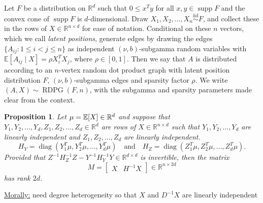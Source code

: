 \documentclass[aspectratio=169]{beamer}
\newcommand{\RDPG}{\operatorname{RDPG}}
\newcommand{\R}{\mathbb{R}}
\newcommand{\E}[2][]{%
	\ifthenelse{ \equal{#1}{} }
	{\ensuremath{\mathbb{E} \brac*{#2}}}
	{\ensuremath{\mathbb{E} \brac*{#2 \, \middle \vert \, #1}}}
}
\DeclarePairedDelimiter{\brac}{[}{]}
\newcommand \diid {\stackrel{\mathrm{iid}}{\sim}}
\DeclareMathOperator*{\diag}{diag}
\DeclareMathOperator*{\supp}{supp}
\newtheorem{proposition}{Proposition}
\theoremstyle{remark}
\begin{document}
\begin{frame}

    \begin{definition}
        Let $F$ be a distribution on $\R^d$ such that $0 \le x^T y$ for all $x,y \in \supp F$ and the convex cone of $\supp F$ is $d$-dimensional.
        Draw $X_1,X_2,\dots,X_n \diid F$, and collect these in the rows of $X \in \R^{n \times d}$ for ease of notation.
        Conditional on these $n$ vectors, which we call {\em latent positions}, generate edges by drawing the edges $\{ A_{ij} : 1 \le i < j \le n \}$ as independent $(\nu,b)$-subgamma random variables with $\mathbb E[ A_{ij} \mid X ] = \rho X_i^T X_j$, where $\rho \in [0,1]$.
        Then we say that $A$ is distributed according to an $n$-vertex random dot product graph with latent position distribution $F$, $(\nu,b)$-subgamma edges and sparsity factor $\rho$.
        We write $(A,X) \sim \RDPG( F, n)$, with the subgamma and sparsity parameters made clear from the context.
    \end{definition}
\end{frame}

\begin{frame}
    \begin{proposition}
        \label{prop:XHX-rank}
        Let $\mu = \E{X} \in \R^d$ and suppose that $Y_1,Y_2,\dots,Y_d,Z_1,Z_2,\dots,Z_d \in \R^d$ are rows of $X \in \R^{n \times d}$ such that $Y_1,Y_2,\dots,Y_d$ are linearly independent and $Z_1,Z_2,\dots,Z_d$ are linearly independent.
        \begin{equation*}
            H_Y = \diag\left( Y_1^T \mu, Y_2^T \mu, \dots, Y_d^T \mu \right)
            ~~~\text{ and }~~~
            H_Z = \diag\left( Z_1^T \mu, Z_2^T \mu, \dots, Z_d^T \mu \right).
        \end{equation*}
        Provided that $Z^{-1} H_Z^{-1} Z - Y^{-1} H_Y^{-1} Y \in \R^{d \times d}$ is invertible, then the matrix
        \begin{equation*} \label{eq:targetmx}
            M = \begin{bmatrix} X & H^{-1} X \end{bmatrix} \in \R^{n \times 2d}
        \end{equation*}
        has rank $2d$.
    \end{proposition}
    
    \underline{Morally:} need degree heterogeneity so that $X$ and $D^{-1} X$ are linearly independent
\end{frame}
\end{document}
